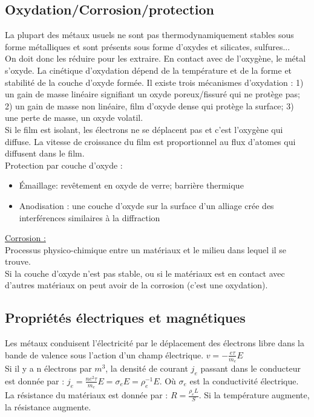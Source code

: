 \documentclass[../main.tex]{subfiles}
\begin{document}
\subsection{Oxydation/Corrosion/protection}
La plupart des métaux usuels ne sont pas thermodynamiquement stables sous forme métalliques et sont présents sous forme d'oxydes et silicates, sulfures...\\
On doit donc les réduire pour les extraire. En contact avec de l'oxygène, le métal s'oxyde. La cinétique d'oxydation dépend de la température et de la forme et stabilité de la couche d'oxyde formée. Il existe trois mécanismes d'oxydation : 1) un gain de masse linéaire signifiant un oxyde poreux/fissuré qui ne protège pas; 2) un gain de masse non linéaire, film d'oxyde dense qui protège la surface; 3) une perte de masse, un oxyde volatil.\\
Si le film est isolant, les électrons ne se déplacent pas et c'est l'oxygène qui diffuse. La vitesse de croissance du film est proportionnel au flux d'atomes qui diffusent dans le film. \\

Protection par couche d'oxyde : 
\begin{itemize}
    \item Émaillage: revêtement en oxyde de verre; barrière thermique\\
    \item Anodisation : une couche d'oxyde sur la surface d'un alliage crée des interférences similaires à la diffraction\\
\end{itemize}

\quad \underline{Corrosion :}\\
Processus physico-chimique entre un matériaux et le milieu dans lequel il se trouve.\\
Si la couche d'oxyde n'est pas stable, ou si le matériaux est en contact avec d'autres matériaux on peut avoir de la corrosion (c'est une oxydation).\\

\subsection{Propriétés électriques et magnétiques}
Les métaux conduisent l'électricité par le déplacement des électrons libre dans la bande de valence sous l'action d'un champ électrique. $v = -\frac{e \tau}{m_e} E$\\
Si il y a n électrons par $m^3$, la densité de courant $j_e$ passant dans le conducteur est donnée par : $j_e = \frac{n e^2 \tau}{m_e} E = \sigma_e E = \rho_e^{-1} E$. Où $\sigma_e$ est la conductivité électrique. \\
La résistance du matériaux est donnée par : $R = \frac{\rho_e L}{S}$. Si la température augmente, la résistance augmente.\\
\end{document}
